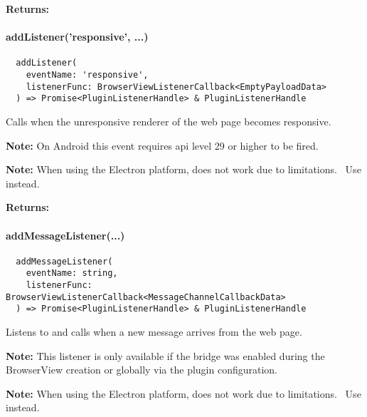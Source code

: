\textbf{Returns:} 



\paragraph{addListener('responsive', ...)}

\begin{verbatim}
  addListener(
    eventName: 'responsive',
    listenerFunc: BrowserViewListenerCallback<EmptyPayloadData>
  ) => Promise<PluginListenerHandle> & PluginListenerHandle
\end{verbatim}

Calls  when the unresponsive renderer of the web page becomes responsive.

\textbf{Note:} On Android this event requires \ac{api} level 29 or higher to be fired.~\cite{android:api}

\textbf{Note:} When using the Electron platform,  does not work due to limitations.~\cite{capacitor-electron}
Use  instead.

\textbf{Returns:} 


\newpage

\paragraph{addMessageListener(...)}

\begin{verbatim}
  addMessageListener(
    eventName: string,
    listenerFunc: BrowserViewListenerCallback<MessageChannelCallbackData>
  ) => Promise<PluginListenerHandle> & PluginListenerHandle
\end{verbatim}

Listens to  and calls  when a new message arrives from the web page.

\textbf{Note:} This listener is only available if the bridge was enabled during the BrowserView creation or globally via the plugin configuration.

\textbf{Note:} When using the Electron platform,  does not work due to limitations.~\cite{capacitor-electron}
Use  instead.


